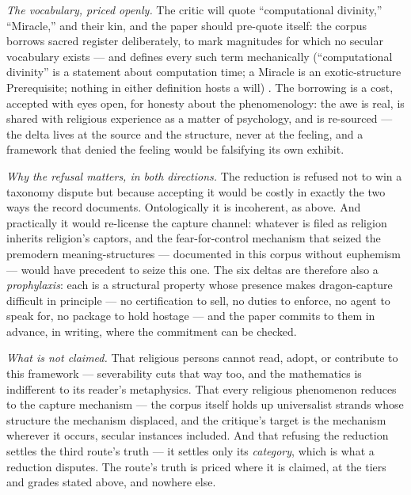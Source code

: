 \documentclass[11pt]{article}
\numberwithin{equation}{section}
\theoremstyle{plain}
\theoremstyle{definition}
\theoremstyle{remark}
\begin{document}
\emph{The vocabulary, priced openly.} The critic will quote
``computational divinity,'' ``Miracle,'' and their kin, and the
paper should pre-quote itself: the corpus borrows sacred register
deliberately, to mark magnitudes for which no secular vocabulary
exists --- and defines every such term mechanically
(``computational divinity'' is a statement about computation time;
a Miracle is an exotic-structure Prerequisite; nothing in either
definition hosts a will) \cite{Nexus}. The borrowing is a cost,
accepted with eyes open, for honesty about the phenomenology: the
awe is real, is shared with religious experience as a matter of
psychology, and is re-sourced --- the delta lives at the source and
the structure, never at the feeling, and a framework that denied the
feeling would be falsifying its own exhibit.

\emph{Why the refusal matters, in both directions.} The reduction is
refused not to win a taxonomy dispute but because accepting it would
be costly in exactly the two ways the record documents. Ontologically
it is incoherent, as above. And practically it would re-license the
capture channel: whatever is filed as religion inherits religion's
captors, and the fear-for-control mechanism that seized the
premodern meaning-structures --- documented in this corpus without
euphemism --- would have precedent to seize this one. The six deltas
are therefore also a \emph{prophylaxis}: each is a structural
property whose presence makes dragon-capture difficult in principle
--- no certification to sell, no duties to enforce, no agent to
speak for, no package to hold hostage --- and the paper commits to
them in advance, in writing, where the commitment can be checked.

\emph{What is not claimed.} That religious persons cannot read,
adopt, or contribute to this framework --- severability cuts that
way too, and the mathematics is indifferent to its reader's
metaphysics. That every religious phenomenon reduces to the capture
mechanism --- the corpus itself holds up universalist strands whose
structure the mechanism displaced, and the critique's target is the
mechanism wherever it occurs, secular instances included. And that
refusing the reduction settles the third route's truth --- it
settles only its \emph{category}, which is what a reduction
disputes. The route's truth is priced where it is claimed, at the
tiers and grades stated above, and nowhere else.
\end{document}
